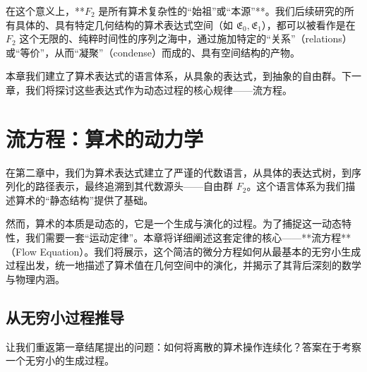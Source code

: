 \documentclass[a4paper,12pt]{book}
\numberwithin{problem}{section}
\numberwithin{definition}{section}
\numberwithin{lemma}{section}
\numberwithin{proposition}{section}
\numberwithin{theorem}{section}
\numberwithin{grammar}{section}
\numberwithin{program}{section}
\numberwithin{convention}{section}
\numberwithin{corollary}{section}
\begin{document}
在这个意义上，**$F_2$ 是所有算术复杂性的“始祖”或“本源”**。我们后续研究的所有具体的、具有特定几何结构的算术表达式空间（如 $\mathfrak{E}_0, \mathfrak{E}_1$），都可以被看作是在 $F_2$ 这个无限的、纯粹时间性的序列之海中，通过施加特定的“关系”（relations）或“等价”，从而“凝聚”（condense）而成的、具有空间结构的产物。

本章我们建立了算术表达式的语言体系，从具象的表达式，到抽象的自由群。下一章，我们将探讨这些表达式作为动态过程的核心规律——流方程。\newpage

\chapter{流方程：算术的动力学}
\label{chap:flow_equation}

在第二章中，我们为算术表达式建立了严谨的代数语言，从具体的表达式树，到序列化的路径表示，最终追溯到其代数源头——自由群 $F_2$。这个语言体系为我们描述算术的“静态结构”提供了基础。

然而，算术的本质是动态的，它是一个生成与演化的过程。为了捕捉这一动态特性，我们需要一套“运动定律”。本章将详细阐述这套定律的核心——**流方程**（Flow Equation）。我们将展示，这个简洁的微分方程如何从最基本的无穷小生成过程出发，统一地描述了算术值在几何空间中的演化，并揭示了其背后深刻的数学与物理内涵。

\section{从无穷小过程推导}
\label{sec:derivation_of_flow_equation}

让我们重返第一章结尾提出的问题：如何将离散的算术操作连续化？答案在于考察一个无穷小的生成过程。
\end{document}
